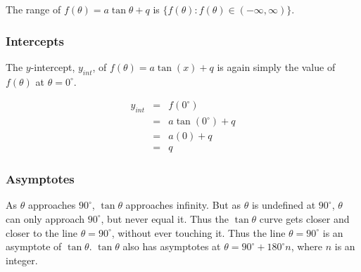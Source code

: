\documentclass[10pt,a4paper,titlepage,twoside,openright]{report}
\begin{document}
The range of $f(\theta)=a\tan \theta +q$ is $\{f(\theta):f(\theta)\in(-\infty,\infty)\}$.

\subsubsection{Intercepts}
The $y$-intercept, $y_{int}$, of $f(\theta)=a \tan(x) + q$ is again simply the value of $f(\theta)$ at $\theta=0^\circ$.

\begin{eqnarray*}
y_{int}&=&f(0^\circ)\\
&=&a \tan(0^\circ) + q\\
&=&a(0)+q\\
&=&q
\end{eqnarray*}

\subsubsection{Asymptotes}
As $\theta$ approaches $90^\circ$, $\tan{\theta}$ approaches infinity. But as  $\theta$ is undefined at $90^\circ$, $\theta$ can only approach $90^\circ$, but never equal it. Thus the $\tan\theta$ curve gets closer and closer to the line $\theta=90^\circ$, without ever touching it. Thus the line $\theta=90^\circ$ is  an asymptote of $\tan\theta$. $\tan\theta$ also has asymptotes at $\theta=90^{\circ}+180^\circ n$, where $n$ is an integer. 
\end{document}
